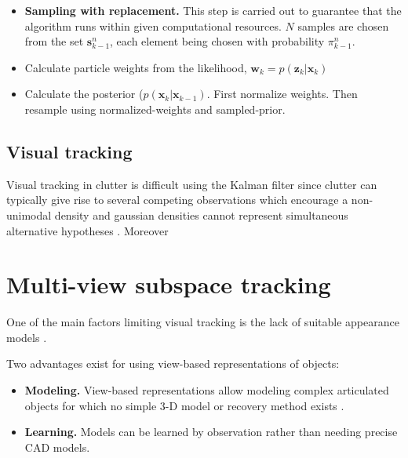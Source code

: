 \documentclass[12pt,letterpaper,doublespaced,ETD]{gt-ece-thesis} %
\begin{document}
\begin{Body}
\begin{itemize}
\item \textbf{Sampling with replacement.}  This step is carried out to guarantee that the algorithm runs within given computational resources.  $N$ samples are chosen from the set $\mathbf{s}_{k-1}^n$, each element being chosen with probability $\pi_{k-1}^n$.  %
\item Calculate particle weights from the likelihood, $\mathbf{w}_k = p(\mathbf{z}_k|\mathbf{x}_k)$
\item Calculate the posterior ($p(\mathbf{x}_k | \mathbf{x}_{k-1})$.  First normalize weights.  Then resample using normalized-weights and sampled-prior. 
\end{itemize}


\subsection{Visual tracking}
Visual tracking in clutter is difficult using the Kalman filter since clutter can typically give rise to several competing observations which encourage a non-unimodal density and gaussian densities cannot represent simultaneous alternative hypotheses \cite{1998_JNL_Condensation_IsardBlake}.  Moreover


\newpage
\section{Multi-view subspace tracking}
One of the main factors limiting visual tracking is the lack of suitable appearance models \cite{2003_JNL_TRKsubspace_Jepson}.

Two advantages exist for using view-based representations of objects:

\begin{itemize}
\item \textbf{Modeling.}  View-based representations allow modeling complex articulated objects for which no simple 3-D model or recovery method exists \cite{1993_CNF_Gestures_Darrell}.  
\item \textbf{Learning.}  Models can be learned by observation rather than needing precise CAD models.
\end{itemize}



\end{Body}
\end{document}
